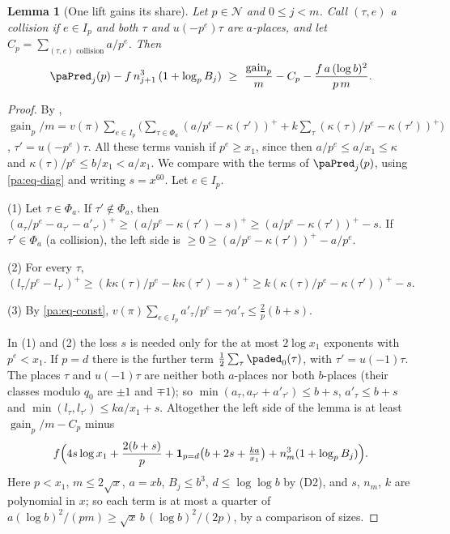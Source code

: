 \documentclass[10pt]{amsart}
\newtheorem{lemma}[theorem]{Lemma}
\theoremstyle{definition}
\theoremstyle{remark}
\providecommand{\auPa}{\Phi_a}
\providecommand{\augain}{\operatorname{gain}}
\begin{document}
\begin{lemma}[One lift gains its share]\label{pa:gain}
Let $p\in\mathcal N$ and $0\le j<m$. Call $(\tau,e)$ a \emph{collision} if $e\in I_p$ and both
$\tau$ and $u(-p^e)\tau$ are $a$-places, and let $C_p=\sum_{(\tau,e)\text{ collision}}a/p^e$. Then
\[
\paPred_j(p)-f\,n_{j+1}^3\,(1+\log_pB_j)\ \ge\ \frac{\augain_p}m-C_p-\frac{f\,a\,(\log b)^2}{p\,m}.
\]
\end{lemma}
\begin{proof}
By {\cite[Definition~14.8]{P46}}, $\augain_p/m=v(\pi)\sum_{e\in I_p}\bigl(\sum_{\tau\in\auPa}
(a/p^e-\kappa(\tau'))^++k\sum_\tau(\kappa(\tau)/p^e-\kappa(\tau'))^+\bigr)$, $\tau'=u(-p^e)\tau$.
All these terms vanish if $p^e\ge x_1$, since then $a/p^e\le a/x_1\le\kappa$ and
$\kappa(\tau)/p^e\le b/x_1<a/x_1$. We compare with the terms of $\paPred_j(p)$, using
\eqref{pa:eq-diag} and writing $s=x^{60}$. Let $e\in I_p$.

(1) Let $\tau\in\auPa$. If $\tau'\notin\auPa$, then $(a_\tau/p^e-a_{\tau'}-a'_{\tau'})^+\ge
(a/p^e-\kappa(\tau')-s)^+\ge(a/p^e-\kappa(\tau'))^+-s$. If $\tau'\in\auPa$ (a collision), the left
side is $\ge0\ge(a/p^e-\kappa(\tau'))^+-a/p^e$.

(2) For every $\tau$, $(l_\tau/p^e-l_{\tau'})^+\ge(k\kappa(\tau)/p^e-k\kappa(\tau')-s)^+\ge
k(\kappa(\tau)/p^e-\kappa(\tau'))^+-s$.

(3) By \eqref{pa:eq-const}, $v(\pi)\sum_{e\in I_p}a'_\tau/p^e=\gamma a'_\tau\le\frac2p(b+s)$.

\noindent In (1) and (2) the loss $s$ is needed only for the at most $2\log x_1$ exponents with
$p^e<x_1$. If $p=d$ there is the further term $\tfrac12\sum_\tau\paded_0(\tau)$, with
$\tau'=u(-1)\tau$. The places $\tau$ and $u(-1)\tau$ are neither both $a$-places nor both
$b$-places (their classes modulo $q_0$ are $\pm1$ and $\mp1$); so
$\min(a_\tau,a_{\tau'}+a'_{\tau'})\le b+s$, $a'_\tau\le b+s$ and $\min(l_\tau,l_{\tau'})\le
ka/x_1+s$. Altogether the left side of the lemma is at least $\augain_p/m-C_p$ minus
\[
f\Bigl(4s\log x_1+\frac{2(b+s)}p+\mathbf 1_{p=d}\bigl(b+2s+\tfrac{ka}{x_1}\bigr)+n_m^3(1+\log_pB_j)
\Bigr).
\]
Here $p<x_1$, $m\le2\sqrt x$, $a=xb$, $B_j\le b^3$, $d\le\log\log b$ by (D2), and $s$, $n_m$,
$k$ are polynomial in $x$; so each term is at most a quarter of $a(\log b)^2/(pm)\ge
\sqrt x\,b\,(\log b)^2/(2p)$, by a comparison of sizes.
\end{proof}
\end{document}
